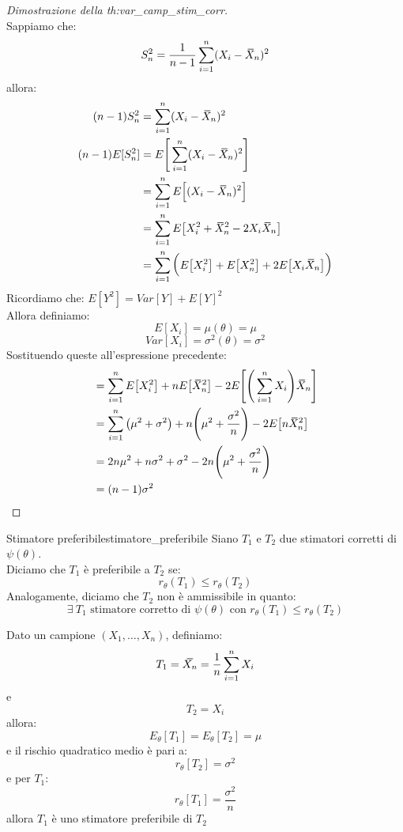 \documentclass[12pt]{report}
\newcounter{definition}
\newcommand{\namerefl}[1]{%
	\bgroup
	\let\nmu\MakeLowercase
	\nameref{#1}\egroup}
\newcommand{\nmu}{}
\newcommand{\wbar}[1]{%
	\accentset{\mbox{\rule{0.55em}{0.5pt}}}{#1}%
}
\begin{document}
	\begin{proof}[Dimostrazione della \namerefl{th:var_camp_stim_corr}] \quad \\
		Sappiamo che:
		\[
		S_n^2= \dfrac{1}{n-1}\sum_{i=1}^{n}(X_i - \wbar{X}_n)^2
		\]
		allora:
		\begin{align*}
			(n-1)S_n^2 &= \sum_{i=1}^{n}(X_i - \wbar{X}_n)^2 \\
			(n-1)E[S_n^2]&= E\Bigg[\sum_{i=1}^{n}(X_i - \wbar{X}_n)^2\Bigg] \\
			&= \sum_{i=1}^{n}E\Big[(X_i - \wbar{X}_n)^2\Big]\\
			&= \sum_{i=1}^{n}E\big[X_i^2 + \wbar{X}_n^2 - 2X_i\wbar{X}_n\big] \\
			&= \sum_{i=1}^{n}\bigg(E\big[X_i^2\big] + E\big[X_n^2\big] + 2E\big[X_i\wbar{X}_n\big]\bigg) \\
		\end{align*}
		Ricordiamo che: $E[Y^2] = Var[Y] + E[Y]^2$ \\
		Allora definiamo:
		\[
		E[X_i] = \mu(\theta) = \mu
		\]
		\[
		Var[X_i]=\sigma^2(\theta)=\sigma^2
		\]
		Sostituendo queste all'espressione precedente:
		\begin{align*}
			&= \sum_{i=1}^{n}E\big[X_i^2\big] + nE\big[\wbar{X}_n^2\big] - 2E\Bigg[\Bigg(\sum_{i=1}^{n}X_i\Bigg)\wbar{X}_n\Bigg] \\
			&= \sum_{i=1}^{n}\big(\mu^2 + \sigma^2\big) + n\Bigg(\mu^2 + \dfrac{\sigma^2}{n}\Bigg) - 2E\big[n\wbar{X}_n^2\big] \\
			&= 2n\mu^2 + n\sigma^2 + \sigma^2 - 2n\Bigg(\mu^2 + \dfrac{\sigma^2}{n}\Bigg) \\
			&= (n-1)\sigma^2
		\end{align*}
	\end{proof}
	\begin{definition}{\nmu Stimatore preferibile}{stimatore_preferibile}
		Siano $T_1$ e $T_2$ due stimatori corretti di $\psi(\theta)$. \\
		Diciamo che $T_1$ è preferibile a $T_2$ se:
		\[
		r_\theta(T_1) \leq r_\theta(T_2)
		\]
		Analogamente, diciamo che $T_2$ non è ammissibile in quanto:
		\[
		\exists\ T_1 \text{ stimatore corretto di }\psi(\theta) \text{ con } r_\theta(T_1) \leq r_\theta(T_2)
		\]
	\end{definition}
	\begin{example}{}{}
		Dato un campione $(X_1, \dots, X_n)$, definiamo:
		\[
		T_1 = \wbar{X_n} = \dfrac{1}{n}\sum_{i=1}^{n}X_i
		\]
		e
		\[
		T_2 = X_i
		\]
		allora:
		\[
		E_\theta[T_1] = E_\theta[T_2] = \mu
		\]
		e il rischio quadratico medio è pari a:
		\[
		r_\theta[T_2] = \sigma^2
		\]
		e per $T_1$:
		\[
		r_\theta[T_1] = \dfrac{\sigma^2}{n}
		\]
		allora $T_1$ è uno stimatore preferibile di $T_2$
	\end{example}
\end{document}
